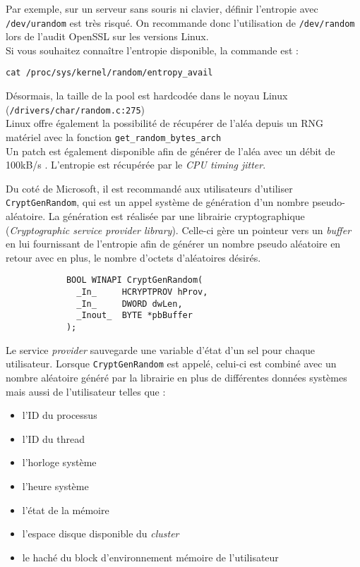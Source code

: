 			Par exemple, sur un serveur sans souris ni clavier, 
			définir l'entropie avec	\texttt{/dev/urandom} est très risqué. 
			On recommande donc l'utilisation de \texttt{/dev/random} lors de 
			l'audit OpenSSL sur les versions Linux.\\
	
			Si vous souhaitez connaître l'entropie disponible, la commande 
			est :
			\begin{center}
				\texttt{cat /proc/sys/kernel/random/entropy\_avail}
			\end{center}	
			
			Désormais, la taille de la pool est hardcodée dans le noyau Linux 
			(\texttt{/drivers/char/random.c:275})\\
			
			Linux offre également la possibilité de récupérer de l’aléa depuis 
			un RNG matériel avec la fonction \texttt{get\_random\_bytes\_arch}
			\cite{archlinuxRNG}\\
		
			Un patch est également disponible afin de générer de l'aléa avec un 
			débit de 100kB/s \cite{mueller2013rng}. 
			L'entropie est récupérée par le \textit{CPU timing jitter}.\\
			
		
			Du coté de Microsoft, il est recommandé aux utilisateurs d'utiliser 
			\texttt{CryptGenRandom}, \cite{wikicryptgenrandom}
			qui est un appel système de génération d'un nombre pseudo-aléatoire. 
			La génération est réalisée par une librairie cryptographique
			 (\textit{Cryptographic service provider library}).
			Celle-ci gère un pointeur vers un \textit{buffer} en lui 
			fournissant de l'entropie afin de générer un nombre pseudo 
			aléatoire en retour avec en plus, le nombre	d'octets d'aléatoires
			désirés.
			
			\begin{verbatim}
			BOOL WINAPI CryptGenRandom(
			  _In_     HCRYPTPROV hProv,
			  _In_     DWORD dwLen,
			  _Inout_  BYTE *pbBuffer
			);
			\end{verbatim}
			
			Le service \textit{provider} sauvegarde une variable d'état d'un 
			sel pour chaque utilisateur. Lorsque \texttt{CryptGenRandom} est 
			appelé, celui-ci est combiné avec un nombre aléatoire généré par 
			la librairie en plus de différentes données systèmes mais aussi de 
			l'utilisateur telles que :\\
			\begin{itemize}
			\item l'ID du processus
			\item l'ID du thread
			\item l'horloge système
			\item l'heure système
			\item l'état de la mémoire
			\item l'espace disque disponible du \textit{cluster}
			\item le haché du block d'environnement mémoire de l'utilisateur\\
			\end{itemize} 
			
